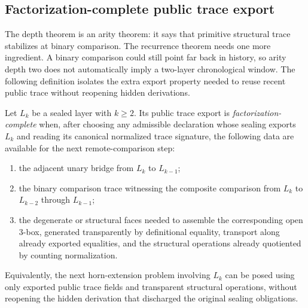 \subsection{Factorization-complete public trace export}

The depth theorem is an arity theorem: it says that primitive structural trace stabilizes at
binary comparison.  The recurrence theorem needs one more ingredient.  A binary comparison
could still point far back in history, so arity depth two does not automatically imply a
two-layer chronological window.  The following definition isolates the extra export property
needed to reuse recent public trace without reopening hidden derivations.

\begin{definition}
Let \(L_k\) be a sealed layer with \(k\geq 2\).  Its public trace export is
\emph{factorization-complete} when, after choosing any admissible declaration whose sealing
exports \(L_k\) and reading its canonical normalized trace signature, the following data are
available for the next remote-comparison step:
\begin{enumerate}
\item the adjacent unary bridge from \(L_k\) to \(L_{k-1}\);
\item the binary comparison trace witnessing the composite comparison from \(L_k\) to
\(L_{k-2}\) through \(L_{k-1}\);
\item the degenerate or structural faces needed to assemble the corresponding open
\(3\)-box, generated transparently by definitional equality, transport along already exported
equalities, and the structural operations already quotiented by counting normalization.
\end{enumerate}
Equivalently, the next horn-extension problem involving \(L_k\) can be posed using only
exported public trace fields and transparent structural operations, without reopening the
hidden derivation that discharged the original sealing obligations.
\end{definition}

